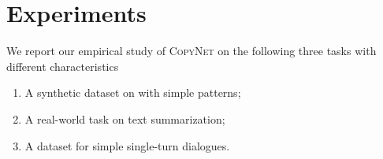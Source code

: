 

\section{Experiments}
We report our empirical study of \textsc{CopyNet} on the following three tasks with different characteristics
\begin{enumerate}
	\vspace{-7pt}
	\item A synthetic dataset on with simple patterns;
	\vspace{-7pt}
	\item A real-world task on text summarization;
	\vspace{-7pt}
	\item A dataset for simple single-turn dialogues.
\end{enumerate}  

